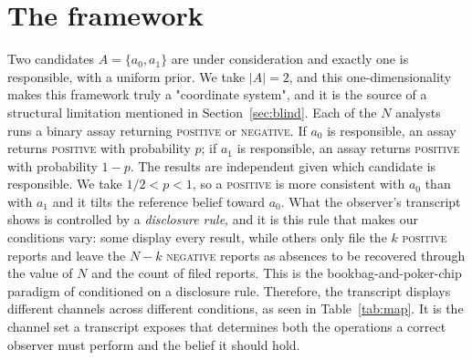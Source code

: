 \documentclass{article}
\theoremstyle{plain}
\theoremstyle{definition}
\theoremstyle{remark}
\begin{document}
\fi %

\section{The framework}\label{sec:framework}

Two candidates $A=\{a_0,a_1\}$ are under consideration and exactly one is
responsible, with a uniform prior. We take $|A|=2$, and this
one-dimensionality makes this framework truly a "coordinate system", and
it is the source of a structural limitation mentioned in
Section~\ref{sec:blind}. Each of the $N$ analysts runs a binary assay returning \textsc{positive} or
\textsc{negative}. If $a_0$ is responsible, an assay returns \textsc{positive}
with probability $p$; if $a_1$ is responsible, an assay returns \textsc{positive} 
with probability $1-p$. The results are independent given which candidate is responsible. 
We take $1/2 < p < 1$,
so a \textsc{positive} is more consistent with $a_0$ than with $a_1$ and it tilts the reference belief
toward $a_0$. What the observer's transcript shows is controlled by
a \emph{disclosure rule}, and it is this rule that makes our conditions vary: some
display every result, while others only file the $k$ \textsc{positive} reports and leave the
$N-k$ \textsc{negative} reports as absences to be recovered through the value of $N$ and the 
count of filed reports. This is the bookbag-and-poker-chip
paradigm of \citet{phillips1966} conditioned on a disclosure rule. Therefore, the 
transcript displays different channels across different conditions, as seen in
Table~\ref{tab:map}. It is the channel set a transcript exposes
that determines both the operations a correct observer must perform and the
belief it should hold. 
\end{document}
